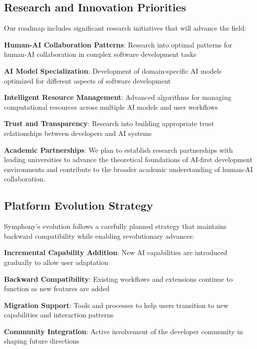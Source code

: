 \subsection*{Research and Innovation Priorities}

Our roadmap includes significant research initiatives that will advance the field:

\begin{expandedlist}
    \item \textbf{Human-AI Collaboration Patterns}: Research into optimal patterns for human-AI collaboration in complex software development tasks
    \item \textbf{AI Model Specialization}: Development of domain-specific AI models optimized for different aspects of software development
    \item \textbf{Intelligent Resource Management}: Advanced algorithms for managing computational resources across multiple AI models and user workflows
    \item \textbf{Trust and Transparency}: Research into building appropriate trust relationships between developers and AI systems
\end{expandedlist}

\textbf{Academic Partnerships}:
We plan to establish research partnerships with leading universities to advance the theoretical foundations of AI-first development environments and contribute to the broader academic understanding of human-AI collaboration.

\subsection*{Platform Evolution Strategy}

Symphony's evolution follows a carefully planned strategy that maintains backward compatibility while enabling revolutionary advances:

\begin{compactlist}
    \item \textbf{Incremental Capability Addition}: New AI capabilities are introduced gradually to allow user adaptation
    \item \textbf{Backward Compatibility}: Existing workflows and extensions continue to function as new features are added
    \item \textbf{Migration Support}: Tools and processes to help users transition to new capabilities and interaction patterns
    \item \textbf{Community Integration}: Active involvement of the developer community in shaping future directions
\end{compactlist}

